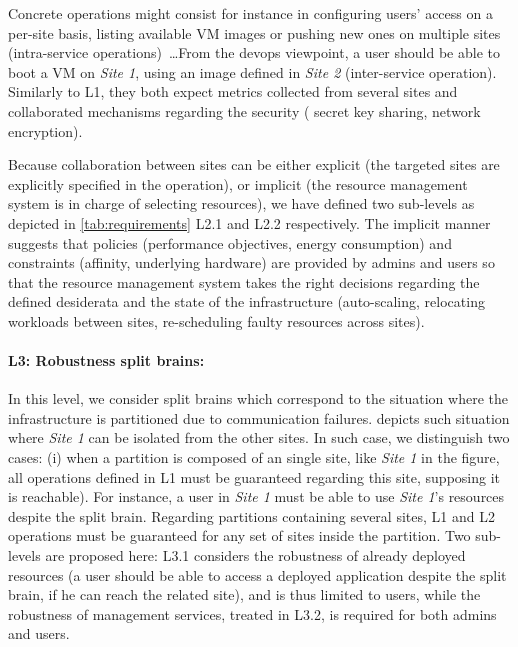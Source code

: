 %
Concrete operations might consist for instance in configuring users'
access on a per-site basis, listing available VM images or pushing new
ones on multiple sites (intra-service operations)~\ldots From the
devops viewpoint, a user should be able to boot a VM on \emph{Site 1},
using an image defined in \emph{Site 2} (inter-service
operation). Similarly to L1, they both expect metrics collected from
several sites and collaborated mechanisms regarding the security (\eg
secret key sharing, network encryption).

Because collaboration between sites can be either explicit (\ie the
targeted sites are explicitly specified in the operation), or implicit
(\ie the resource management system is in charge of selecting
resources), we have defined two sub-levels as depicted in
\cref{tab:requirements} L2.1 and L2.2 respectively.  The implicit
manner suggests that policies (\eg performance objectives, energy
consumption) and constraints (\eg affinity, underlying hardware) are
provided by admins and users so that the resource management system takes
the right decisions regarding the defined desiderata and the state of
the infrastructure (\eg auto-scaling, relocating workloads between
sites, re-scheduling faulty resources across sites).

\paragraph{L3: Robustness \wrt split brains:}
In this level, we consider split brains which correspond to the situation
where the infrastructure is partitioned due to communication failures.
 depicts such situation where \emph{Site 1} can be
isolated from the other sites. In such case, we distinguish two cases: (i) when
a partition is composed of an single site, like \emph{Site 1} in the figure,
all operations defined in L1 must be guaranteed regarding this site, supposing
it is reachable). For instance, a user in \emph{Site 1} must be
able to use \emph{Site 1}'s resources despite the split brain. Regarding
partitions containing several sites, L1 and L2 operations must be guaranteed
for any set of sites inside the partition.
Two sub-levels are proposed here: L3.1 considers the robustness of already
deployed resources (\eg a user should be able to access a deployed application
despite the split brain, if he can reach the related site), and is thus limited
to users, while the robustness of management services, treated in L3.2, is
required for both admins and users.

